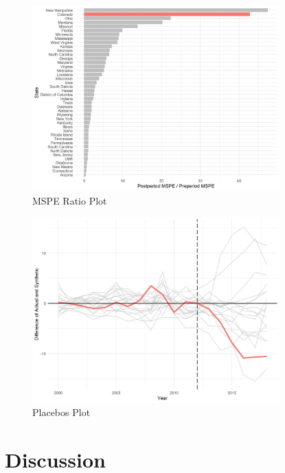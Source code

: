 \documentclass{article}
\begin{document}
\begin{figure}[H]
	\begin{center}
		\includegraphics[width=0.85\textwidth]{mspe_plot_colorado}
	\end{center}
	\caption{MSPE Ratio Plot}
	\label{fig:mspe_plot_colorado}
\end{figure}

\begin{figure}[H]
	\begin{center}
		\includegraphics[width=0.85\textwidth]{placebos_plot_colorado}
	\end{center}
	\caption{Placebos Plot}
	\label{fig:placebos_plot_colorado}
\end{figure}


\section{Discussion}
\end{document}
